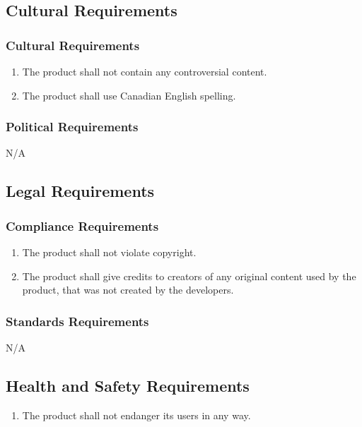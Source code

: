 \documentclass[12pt, titlepage]{article}
\begin{document}
\subsection{Cultural Requirements}

\subsubsection{Cultural Requirements}
\begin{enumerate}[{CR}1. ]
    \item The product shall not contain any controversial content.
    \item The product shall use Canadian English spelling.
\end{enumerate}

\subsubsection{Political Requirements}
N/A



\subsection{Legal Requirements}

\subsubsection{Compliance Requirements}
\begin{enumerate}[{LR}1. ]
    \item The product shall not violate copyright.
    \item The product shall give credits to creators of any original content used by the product, that was not created by the developers.
\end{enumerate}

\subsubsection{Standards Requirements}
N/A



\subsection{Health and Safety Requirements}
\begin{enumerate}[{HS}1. ]
    \item The product shall not endanger its users in any way.
\end{enumerate}
\end{document}
